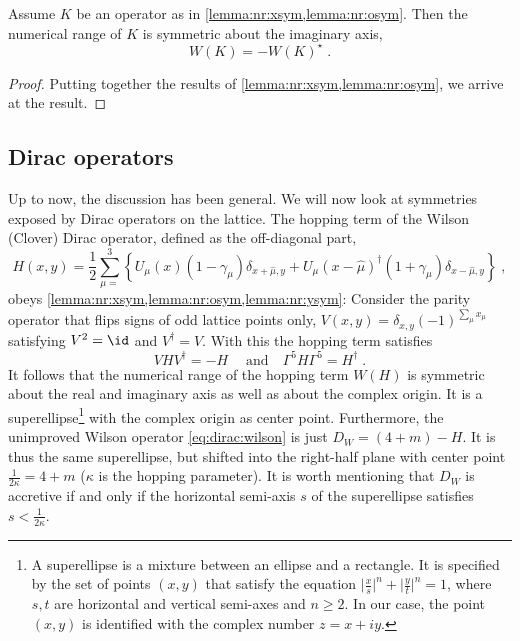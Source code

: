 \begin{corollary} \label{lemma:nr:ysym}
Assume $K$ be an operator as in \cref{lemma:nr:xsym,lemma:nr:osym}.
Then the numerical range of $K$ is symmetric about the imaginary axis,
\begin{equation}
W(K) = - W(K)^{\star} \;.
\end{equation}
\end{corollary}

\begin{proof}
Putting together the results of \cref{lemma:nr:xsym,lemma:nr:osym}, we arrive at the result.
\end{proof}

\subsection{Dirac operators}

Up to now, the discussion has been general.
We will now look at symmetries exposed by Dirac operators on the lattice.
The hopping term of the Wilson (Clover) Dirac operator, defined as the off-diagonal part,
\begin{equation}
H(x,y) = \frac{1}{2} \sum_{\mu=}^{3}
\left\{
      U_{\mu}(x) (1 - \gamma_{\mu}) \delta_{x+\hat{\mu}, y}
    + U_{\mu}(x - \hat{\mu})^{\dagger} (1 + \gamma_{\mu}) \delta_{x-\hat{\mu}, y}
\right\} \;,
\end{equation}
obeys \cref{lemma:nr:xsym,lemma:nr:osym,lemma:nr:ysym}:
Consider the parity operator that flips signs of odd lattice points only, $V(x,y) = \delta_{x,y} (-1)^{\sum_{\mu} x_{\mu}}$ satisfying $V^{2} = \id$ and $V^{\dagger} = V$.
With this the hopping term satisfies
\begin{equation}
V H V^{\dagger} = -H \;
\quad
\text{and}
\quad
\Gamma^{5} H \Gamma^{5} = H^{\dagger} \;.
\end{equation}
It follows that the numerical range of the hopping term $W(H)$ is symmetric about the real and imaginary axis as well as about the complex origin.
It is a superellipse\footnote{A superellipse is a mixture between an ellipse and a rectangle. It is specified by the set of points $(x,y)$ that satisfy the equation $\lvert \frac{x}{s} \rvert^n + \lvert \frac{y}{t} \rvert^n = 1$, where $s,t$ are horizontal and vertical semi-axes and $n \geq 2$. In our case, the point $(x,y)$ is identified with the complex number $z = x + iy$.} with the complex origin as center point.
Furthermore, the unimproved Wilson operator \cref{eq:dirac:wilson} is just $D_W = (4+m) - H$.
It is thus the same superellipse, but shifted into the right-half plane with center point $\frac{1}{2 \kappa} = 4+m$ ($\kappa$ is the hopping parameter).
It is worth mentioning that $D_W$ is accretive if and only if the horizontal semi-axis $s$ of the superellipse satisfies $s < \frac{1}{2 \kappa}$.


